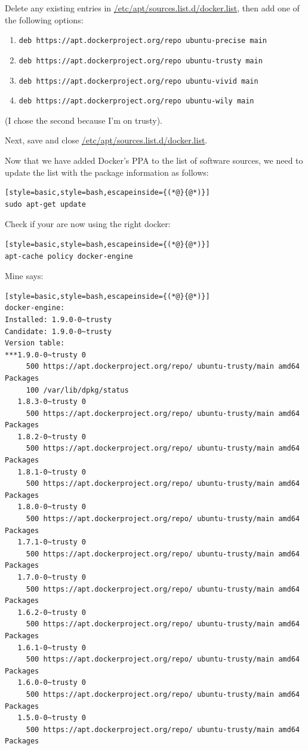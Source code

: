 \documentclass[12pt, a4paper, twoside, openany, titlepage]{book}
\begin{document}
Delete any existing entries in \url{/etc/apt/sources.list.d/docker.list}, then add one of the following options:
\begin{enumerate}
\item{\texttt{deb https://apt.dockerproject.org/repo ubuntu-precise main}}
\item{\texttt{deb https://apt.dockerproject.org/repo ubuntu-trusty main}}
\item{\texttt{deb https://apt.dockerproject.org/repo ubuntu-vivid main}}
\item{\texttt{deb https://apt.dockerproject.org/repo ubuntu-wily main}}
\end{enumerate}
(I chose the second because I'm on trusty).


Next, save and close \url{/etc/apt/sources.list.d/docker.list}.

Now that we have added Docker's PPA to the list of software sources, we need to update the list with the package information as follows:
\begin{lstlisting}[style=basic,style=bash,escapeinside={(*@}{@*)}]
sudo apt-get update
\end{lstlisting}

Check if your are now using the right docker:
\begin{lstlisting}[style=basic,style=bash,escapeinside={(*@}{@*)}]
apt-cache policy docker-engine
\end{lstlisting}
Mine says:
\begin{lstlisting}[style=basic,style=bash,escapeinside={(*@}{@*)}]
docker-engine:
Installed: 1.9.0-0~trusty
Candidate: 1.9.0-0~trusty
Version table:
***1.9.0-0~trusty 0
     500 https://apt.dockerproject.org/repo/ ubuntu-trusty/main amd64 Packages
     100 /var/lib/dpkg/status
   1.8.3-0~trusty 0
     500 https://apt.dockerproject.org/repo/ ubuntu-trusty/main amd64 Packages
   1.8.2-0~trusty 0
     500 https://apt.dockerproject.org/repo/ ubuntu-trusty/main amd64 Packages
   1.8.1-0~trusty 0
     500 https://apt.dockerproject.org/repo/ ubuntu-trusty/main amd64 Packages
   1.8.0-0~trusty 0
     500 https://apt.dockerproject.org/repo/ ubuntu-trusty/main amd64 Packages
   1.7.1-0~trusty 0
     500 https://apt.dockerproject.org/repo/ ubuntu-trusty/main amd64 Packages
   1.7.0-0~trusty 0
     500 https://apt.dockerproject.org/repo/ ubuntu-trusty/main amd64 Packages
   1.6.2-0~trusty 0
     500 https://apt.dockerproject.org/repo/ ubuntu-trusty/main amd64 Packages
   1.6.1-0~trusty 0
     500 https://apt.dockerproject.org/repo/ ubuntu-trusty/main amd64 Packages
   1.6.0-0~trusty 0
     500 https://apt.dockerproject.org/repo/ ubuntu-trusty/main amd64 Packages
   1.5.0-0~trusty 0
     500 https://apt.dockerproject.org/repo/ ubuntu-trusty/main amd64 Packages
\end{lstlisting}
\end{document}
